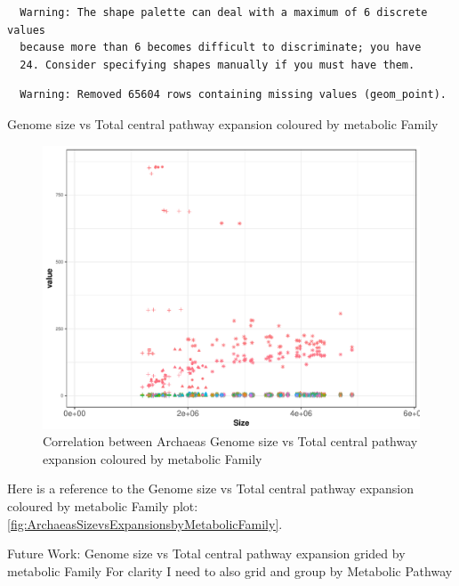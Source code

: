 \documentclass[12pt,twoside]{reedthesis}
\begin{document}
  \begin{verbatim}
  Warning: The shape palette can deal with a maximum of 6 discrete values
  because more than 6 becomes difficult to discriminate; you have
  24. Consider specifying shapes manually if you must have them.
  \end{verbatim}
  
  \begin{verbatim}
  Warning: Removed 65604 rows containing missing values (geom_point).
  \end{verbatim}
  
  Genome size vs Total central pathway expansion coloured by metabolic
  Family
  
  \begin{figure}[h!tbp]
  \centering
  \includegraphics[angle = 0,scale = 0.6]{chapter2/Archaeas/ArchaeasSizevsExpansionsbyMetabolicFamily.pdf}
  \caption[Correlation between Archaeas Genome size vs Total central pathway expansion coloured by metabolic Family]{\normalsize{Correlation between Archaeas Genome size vs Total central pathway expansion coloured by metabolic Family}}
  \label{fig:ArchaeasSizevsExpansionsbyMetabolicFamily}
  \end{figure}
  
  Here is a reference to the Genome size vs Total central pathway
  expansion coloured by metabolic Family plot:
  \autoref{fig:ArchaeasSizevsExpansionsbyMetabolicFamily}. \clearpage 
  
  Future Work: Genome size vs Total central pathway expansion grided by
  metabolic Family For clarity I need to also grid and group by Metabolic
  Pathway
  
\end{document}
